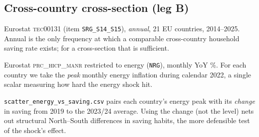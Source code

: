 \documentclass[11pt,a4paper]{article}
\newcommand{\code}[1]{\texttt{#1}}
\newcommand{\dataset}[1]{\textsc{#1}}
\begin{document}
\subsection{Cross-country cross-section (leg B)}
\begin{description}[leftmargin=1.4em,style=nextline]
\item[Saving by country] Eurostat \dataset{tec00131} (item \code{SRG\_S14\_S15}),
  \emph{annual}, 21 EU countries, 2014--2025. Annual is the only frequency at
  which a comparable cross-country household saving rate exists; for a
  cross-section that is sufficient.
\item[Energy shock] Eurostat \dataset{prc\_hicp\_manr} restricted to energy
  (\code{NRG}), monthly YoY \%. For each country we take the \emph{peak} monthly
  energy inflation during calendar 2022, a single scalar measuring how hard the
  energy shock hit.
\item[Derived join] \code{scatter\_energy\_vs\_saving.csv} pairs each country's
  energy peak with its \emph{change} in saving from 2019 to the 2023/24 average.
  Using the change (not the level) nets out structural North--South differences
  in saving habits, the more defensible test of the shock's effect.
\end{description}

\end{document}
